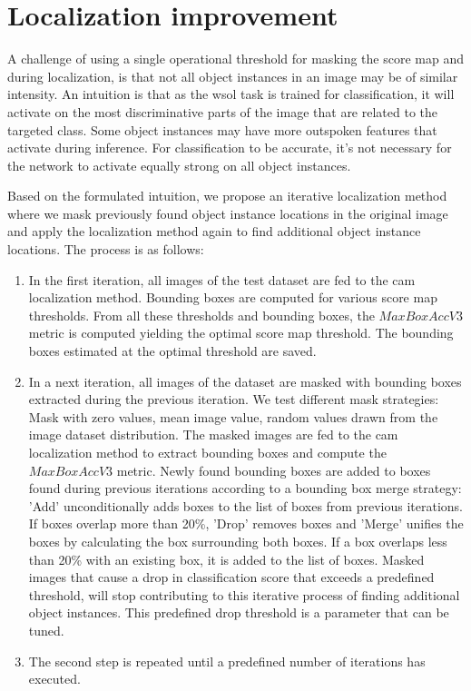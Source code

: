 \section{Localization improvement} \label{sec:method_localization_improvement}
A challenge of using a single operational threshold for masking the score map and during localization, is that not all object instances in an image may be of similar intensity. An intuition is that as the \acrshort{wsol} task is trained for classification, it will activate on the most discriminative parts of the image that are related to the targeted class. Some object instances may  have more outspoken features that activate during inference. For classification to be accurate, it's not necessary for the network to activate equally strong on all object instances.

Based on the formulated intuition, we propose an iterative localization method where we mask previously found object instance locations in the original image and apply the localization method again to find additional object instance locations. The process is as follows:

\begin{enumerate}
    \item In the first iteration, all images of the test dataset are fed to the \acrshort{cam} localization method. Bounding boxes are computed for various score map thresholds. From all these thresholds and bounding boxes, the $MaxBoxAccV3$ metric is computed yielding the optimal score map threshold. The bounding boxes estimated at the optimal threshold are saved.
    \item In a next iteration, all images of the dataset are masked with bounding boxes extracted during the previous iteration. We test different mask strategies: Mask with zero values, mean image value, random values drawn from the image dataset distribution. The masked images are fed to the \acrshort{cam} localization method to extract bounding boxes and compute the $MaxBoxAccV3$ metric. Newly found bounding boxes are added to boxes found during previous iterations according to a bounding box merge strategy: 'Add' unconditionally adds boxes to the list of boxes from previous iterations. If boxes overlap more than 20\%, 'Drop' removes boxes and 'Merge' unifies the boxes by calculating the box surrounding both boxes. If a box overlaps less than 20\% with an existing box, it is added to the list of boxes. Masked images that cause a drop in classification score that exceeds a predefined threshold, will stop contributing to this iterative process of finding additional object instances. This predefined drop threshold is a parameter that can be tuned.
    \item The second step is repeated until a predefined number of iterations  has executed.
\end{enumerate}

